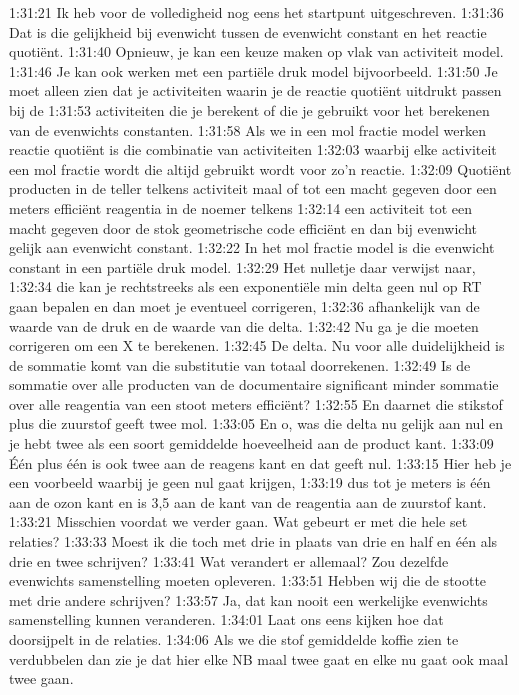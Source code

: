 1:31:21
Ik heb voor de volledigheid nog eens het startpunt uitgeschreven.
1:31:36
Dat is die gelijkheid bij evenwicht tussen de evenwicht constant en het reactie quotiënt.
1:31:40
Opnieuw, je kan een keuze maken op vlak van activiteit model.
1:31:46
Je kan ook werken met een partiële druk model bijvoorbeeld.
1:31:50
Je moet alleen zien dat je activiteiten waarin je de reactie quotiënt uitdrukt passen bij de
1:31:53
activiteiten die je berekent of die je gebruikt voor het berekenen van de evenwichts constanten.
1:31:58
Als we in een mol fractie model werken reactie quotiënt is die combinatie van activiteiten
1:32:03
waarbij elke activiteit een mol fractie wordt die altijd gebruikt wordt voor zo'n reactie.
1:32:09
Quotiënt producten in de teller telkens activiteit maal of tot een macht gegeven door een meters efficiënt reagentia in de noemer telkens
1:32:14
een activiteit tot een macht gegeven door de stok geometrische code efficiënt en dan bij evenwicht gelijk aan evenwicht constant.
1:32:22
In het mol fractie model is die evenwicht constant in een partiële druk model.
1:32:29
Het nulletje daar verwijst naar,
1:32:34
die kan je rechtstreeks als een exponentiële min delta geen nul op RT gaan bepalen en dan moet je eventueel corrigeren,
1:32:36
afhankelijk van de waarde van de druk en de waarde van die delta.
1:32:42
Nu ga je die moeten corrigeren om een X te berekenen.
1:32:45
De delta. Nu voor alle duidelijkheid is de sommatie komt van die substitutie van totaal doorrekenen.
1:32:49
Is de sommatie over alle producten van de documentaire significant minder sommatie over alle reagentia van een stoot meters efficiënt?
1:32:55
En daarnet die stikstof plus die zuurstof geeft twee mol.
1:33:05
En o, was die delta nu gelijk aan nul en je hebt twee als een soort gemiddelde hoeveelheid aan de product kant.
1:33:09
Één plus één is ook twee aan de reagens kant en dat geeft nul.
1:33:15
Hier heb je een voorbeeld waarbij je geen nul gaat krijgen,
1:33:19
dus tot je meters is één aan de ozon kant en is 3,5 aan de kant van de reagentia aan de zuurstof kant.
1:33:21
Misschien voordat we verder gaan. Wat gebeurt er met die hele set relaties?
1:33:33
Moest ik die toch met drie in plaats van drie en half en één als drie en twee schrijven?
1:33:41
Wat verandert er allemaal? Zou dezelfde evenwichts samenstelling moeten opleveren.
1:33:51
Hebben wij die de stootte met drie andere schrijven?
1:33:57
Ja, dat kan nooit een werkelijke evenwichts samenstelling kunnen veranderen.
1:34:01
Laat ons eens kijken hoe dat doorsijpelt in de relaties.
1:34:06
Als we die stof gemiddelde koffie zien te verdubbelen dan zie je dat hier elke NB maal twee gaat en elke nu gaat ook maal twee gaan.
